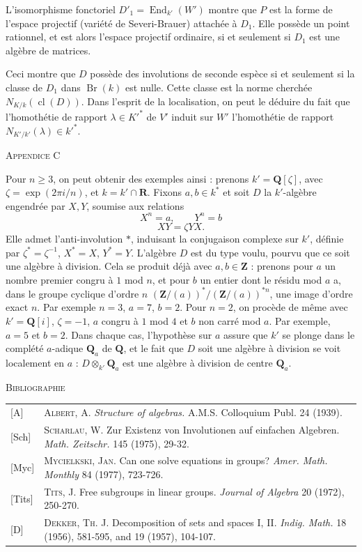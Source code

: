\documentclass[10pt,a4paper]{article}
\DeclareMathOperator{\End}{End}
\DeclareMathOperator{\Br}{Br}
\DeclareMathOperator{\cl}{cl}
\newcommand{\AppendixHeading}[1]{\par\vspace{1.2em}\begin{center}\textsc{Appendice #1}\end{center}\vspace{0.6em}\par}
\newcommand{\BibliographyHeading}{\par\vspace{1.2em}\begin{center}\textsc{Bibliographie}\end{center}\vspace{0.6em}\par}
\begin{document}
L'isomorphisme fonctoriel $D'_1=\End_{k'}(W')$ montre que $P$ est la forme de l'espace
projectif (variété de Severi-Brauer) attachée à $D_1$. Elle possède un point rationnel,
et est alors l'espace projectif ordinaire, si et seulement si $D_1$ est une algèbre de matrices.

\newpage
Ceci montre que $D$ possède des involutions de seconde espèce si et seulement si la classe
de $D_1$ dans $\Br(k)$ est nulle. Cette classe est la norme cherchée $N_{K/k}(\cl(D))$. Dans
l'esprit de la localisation, on peut le déduire du fait que l'homothétie de rapport
$\lambda\in K'^*$ de $V'$ induit sur $W'$ l'homothétie de rapport $N_{K'/k'}(\lambda)\in k'^*$.

\AppendixHeading{C}
Pour $n\geq3$, on peut obtenir des exemples ainsi : prenons $k'=\mathbf{Q}[\zeta]$, avec
$\zeta=\exp(2\pi i/n)$, et $k=k'\cap\mathbf{R}$. Fixons $a,b\in k^*$ et soit $D$ la $k'$-algèbre
engendrée par $X,Y$, soumise aux relations
\[
X^n=a,\qquad Y^n=b
\]
\[
XY=\zeta YX.
\]
Elle admet l'anti-involution $*$, induisant la conjugaison complexe sur $k'$, définie
par $\zeta^*=\zeta^{-1}$, $X^*=X$, $Y^*=Y$. L'algèbre $D$ est du type voulu,
pourvu que ce soit une algèbre à division. Cela se produit déjà avec $a,b\in\mathbf{Z}$ : prenons
pour $a$ un nombre premier congru à $1$ mod $n$, et pour $b$ un entier dont le résidu mod $a$
a, dans le groupe cyclique d'ordre $n$ $(\mathbf{Z}/(a))^*/(\mathbf{Z}/(a))^{*n}$, une image d'ordre exact $n$.
Par exemple $n=3$, $a=7$, $b=2$. Pour $n=2$, on procède de même avec
$k'=\mathbf{Q}[i]$, $\zeta=-1$, $a$ congru à $1$ mod $4$ et $b$ non carré mod $a$. Par
exemple, $a=5$ et $b=2$. Dans chaque cas, l'hypothèse sur $a$ assure que $k'$
se plonge dans le complété $a$-adique $\mathbf{Q}_a$ de $\mathbf{Q}$, et le fait que $D$ soit une algèbre à division
se voit localement en $a$ : $D\otimes_{k'}\mathbf{Q}_a$ est une algèbre à division de centre $\mathbf{Q}_a$.

\newpage
\BibliographyHeading
\noindent
\begin{tabular}{@{}p{11mm}p{}@{}}
{[A]} & \textsc{Albert, A.} \textit{Structure of algebras.} A.M.S. Colloquium Publ. 24 (1939). \\[0.35em]
{[Sch]} & \textsc{Scharlau, W.} Zur Existenz von Involutionen auf einfachen Algebren. \textit{Math. Zeitschr.} 145 (1975), 29-32. \\[0.35em]
{[Myc]} & \textsc{Mycielkski, Jan.} Can one solve equations in groups? \textit{Amer. Math. Monthly} 84 (1977), 723-726. \\[0.35em]
{[Tits]} & \textsc{Tits, J.} Free subgroups in linear groups. \textit{Journal of Algebra} 20 (1972), 250-270. \\[0.35em]
{[D]} & \textsc{Dekker, Th. J.} Decomposition of sets and spaces I, II. \textit{Indig. Math.} 18 (1956), 581-595, and 19 (1957), 104-107.
\end{tabular}
\end{document}
